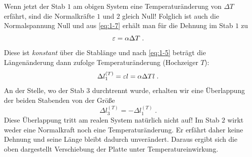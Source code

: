 \begin{example}
 	Wenn jetzt der Stab $1$ am obigen System eine Temperaturänderung von $\Delta T$ erfährt, sind die Normalkräfte $1$ und $2$ gleich Null!\footnotemark{} Folglich ist auch die Normalspannung Null und aus \eqref{eq:1-7} erhält man für die Dehnung im Stab $1$ zu
 	\begin{equation}
 		\varepsilon = \alpha\Delta T \; .
 	\end{equation}
 	Diese ist \emph{konstant} über die Stablänge und nach \eqref{eq:1-5} beträgt die Längenänderung dann zufolge Temperaturänderung (Hochzeiger $T$)\footnotemark{}:
 	\begin{equation}
 		\Delta l_1^{(T)} = \varepsilon l = \alpha\Delta T l \; .
 	\end{equation}
 	An der Stelle, wo der Stab $3$ durchtrennt wurde, erhalten wir eine Überlappung der beiden Stabenden von der Größe
 	\begin{equation}
 		\Delta l_3^{(T)} = - \Delta l_1^{(T)} \; .
 	\end{equation}
 	Diese Überlappung tritt am realen System natürlich nicht auf!
 	Im Stab $2$ wirkt weder eine Normalkraft noch eine Temperaturänderung.
 	Er erfährt daher keine Dehnung und seine Länge bleibt dadurch unverändert.
 	Daraus ergibt sich die oben dargestellt Verschiebung der Platte unter Temperatureinwirkung.
    

\end{example}
